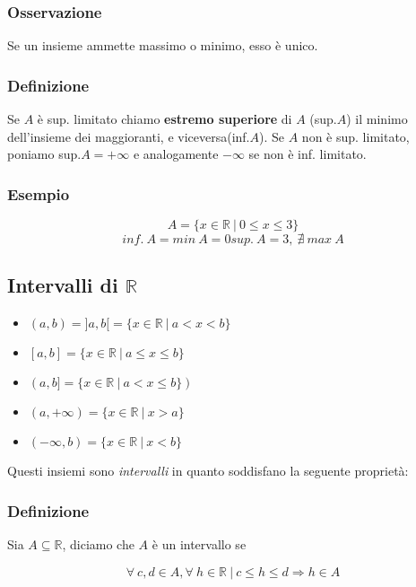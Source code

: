     \subsubsection*{Osservazione}
    Se un insieme ammette massimo o minimo, esso è unico.
    \subsubsection*{Definizione}
    Se $A$ è sup. limitato chiamo \textbf{estremo superiore} di $A$ (sup.$A$) il minimo dell'insieme
    dei maggioranti, e viceversa(inf.$A$).
    Se $A$ non è sup. limitato, poniamo sup.$A = + \infty$ e analogamente $-\infty$ se non è inf. limitato.
    \subsubsection*{Esempio}
    \begin{Large}
        \[
            A = \{x \in \mathbb{R}\ |\ 0 \leq x \leq 3\}
        \]
        \[
            inf.\ A = min\ A = 0
            sup.\ A = 3,\ \nexists\ max\ A     
        \]
    \end{Large}
\subsection{Intervalli di $\mathbb{R}$}
\begin{Large}
\begin{itemize}
    \item $(a,b) = ]a,b[= \{x \in \mathbb{R}\ |\ a < x < b\}$
    \item $[a,b]=\{x \in \mathbb{R}\ |\ a \leq x \leq b\}$
    \item $(a,b] = \{x \in \mathbb{R}\ |\ a < x \leq b\})$
    \item $(a,+\infty) = \{x \in \mathbb{R}\ |\ x > a\}$
    \item $(-\infty,b) = \{x \in \mathbb{R}\ |\ x < b \}$
\end{itemize}
\end{Large}
Questi insiemi sono \textit{intervalli} in quanto soddisfano la seguente proprietà:
\subsubsection*{Definizione}
Sia $A\subseteq\mathbb{R}$, diciamo che $A$ è un intervallo se\\
\begin{Large}
    \[
    \forall\ c,d \in A, \forall\ h \in \mathbb{R}\ |\ c \leq h \leq d \Rightarrow h \in A
    \]
\end{Large}
